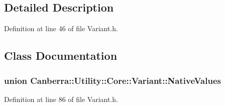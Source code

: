 \subsection{Detailed Description}


Definition at line 46 of file Variant.\+h.



\subsection{Class Documentation}
\label{union_canberra_1_1_utility_1_1_core_1_1_variant_1_1_native_values}
\subsubsection{union Canberra\+:\+:Utility\+:\+:Core\+:\+:Variant\+:\+:Native\+Values}


Definition at line 86 of file Variant.\+h.




